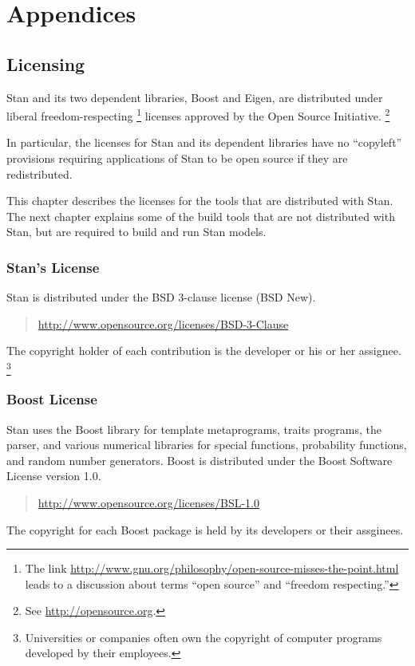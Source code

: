 \part*{Appendices}


\chapter{Licensing}\label{licensing.appendix}

\noindent
Stan and its two dependent libraries, Boost and Eigen, are
distributed under liberal freedom-respecting%
%
\footnote{The link
  \url{http://www.gnu.org/philosophy/open-source-misses-the-point.html}
  leads to a discussion about terms ``open
  source'' and ``freedom respecting.''}
%
licenses approved by the Open Source Initiative.%
\footnote{See \url{http://opensource.org}.}

In particular, the licenses for Stan and its dependent libraries have
no ``copyleft'' provisions requiring applications of Stan to be
open source if they are redistributed.

This chapter describes the licenses for the tools that are distributed
with Stan.  The next chapter explains some of the build tools that
are not distributed with Stan, but are required to build and run
Stan models.

\section{Stan's License}

Stan is distributed under the BSD 3-clause license (BSD New).
%
\begin{quote}
\url{http://www.opensource.org/licenses/BSD-3-Clause}
\end{quote}
%
The copyright holder of each contribution is the developer or his or
her assignee.%
%
\footnote{Universities or companies often own the copyright of
  computer programs developed by their employees.}


\section{Boost License}

Stan uses the Boost library for template metaprograms, traits
programs, the parser, and various numerical libraries for special
functions, probability functions, and random number generators.  Boost
is distributed under the Boost Software License version 1.0.
%
\begin{quote}
\url{http://www.opensource.org/licenses/BSL-1.0}
\end{quote}
%
The copyright for each Boost package is held by its developers or their
assginees.


